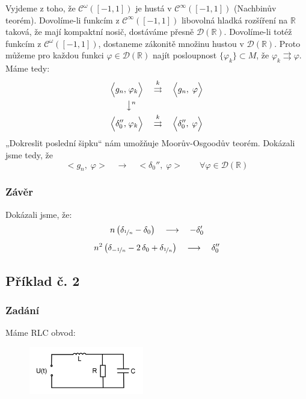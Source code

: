 \documentclass{article}
\def\R{\mathbb{R}}
\def\D{\mathcal{D}}
\def\Cont{\mathcal{C}}
\begin{document}
Vyjdeme z toho, že $\Cont^\omega([-1,1])$ je hustá v $\Cont^\infty([-1,1])$ (Nachbinův teorém). Dovolíme-li funkcím z $\Cont^\infty([-1,1])$ libovolná hladká rozšíření na $\R$ taková, že mají kompaktní nosič, dostáváme přesně $\D(\R)$. Dovolíme-li totéž funkcím z $\Cont^\omega([-1,1])$, dostaneme zákonitě množinu hustou v $\D(\R)$. Proto můžeme pro každou funkci $\varphi \in \D(\R)$ najít posloupnost $\{\varphi_k\} \subset M$, že $\varphi_k \rightrightarrows \varphi$. Máme tedy:
\begin{align*}
    \Big< g_n, &\; \varphi_k \Big>
    \quad \stackrel{k}{\rightrightarrows} \quad
    \Big< g_n, \; \varphi \Big>
    \\
    &\big\downarrow {}^n
    \\
    \Big<\delta_0'', &\; \varphi_k \Big>
    \quad \stackrel{k}{\rightrightarrows} \quad
    \Big< \delta_0'', \; \varphi \Big>
\end{align*}
„Dokreslit poslední šipku“ nám umožňuje Moorův-Osgoodův teorém. Dokázali jsme tedy, že
\begin{equation*}
    \Big<g_n, \; \varphi \Big>
    \quad \longrightarrow \quad
    \Big<\delta_0'', \; \varphi \Big>
    \qquad
    \forall \varphi \in \D(\R)
\end{equation*}

\subsubsection*{Závěr}
Dokázali jsme, že:
\begin{gather*}
    n \, \big( \delta_{\nicefrac{1}{n}} - \delta_0 \big)
    \quad \longrightarrow \quad
    -\delta_0 '
    \\[5pt]
    n^2 \, \big(
        \delta_{-\nicefrac{1}{n}}
        -2 \, \delta_0
        + \delta_{\nicefrac{1}{n}}
    \big)
    \quad \longrightarrow \quad
    \delta_0''
\end{gather*}

\pagebreak

\subsection*{Příklad č. 2}
\subsubsection*{Zadání}
Máme RLC obvod:
\begin{figure}[h!]
    \centering
    \includegraphics[width=5cm]{rlc.png}
\end{figure}
\end{document}
